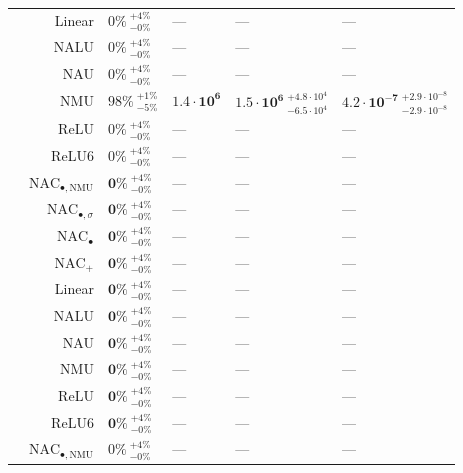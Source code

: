 \begin{longtable}{crllll}
\nopagebreak
 & Linear & $0\% {~}^{+4\%}_{-0\%}$ & --- & --- & ---\\

\nopagebreak
 & NALU & $0\% {~}^{+4\%}_{-0\%}$ & --- & --- & ---\\

\nopagebreak
 & NAU & $0\% {~}^{+4\%}_{-0\%}$ & --- & --- & ---\\

\nopagebreak
 & NMU & $98\% {~}^{+1\%}_{-5\%}$ & $\mathbf{1.4 \cdot 10^{6}}$ & $\mathbf{1.5 \cdot 10^{6}} {~}^{+4.8 \cdot 10^{4}}_{-6.5 \cdot 10^{4}}$ & $\mathbf{4.2 \cdot 10^{-7}} {~}^{+2.9 \cdot 10^{-8}}_{-2.9 \cdot 10^{-8}}$\\

\nopagebreak
 & ReLU & $0\% {~}^{+4\%}_{-0\%}$ & --- & --- & ---\\

\nopagebreak
\multirow{-10}{*}{\centering\arraybackslash $\bm{\times}$} & ReLU6 & $0\% {~}^{+4\%}_{-0\%}$ & --- & --- & ---\\
\cmidrule{1-6}
 & $\mathrm{NAC}_{\bullet,\mathrm{NMU}}$ & $\mathbf{0\%} {~}^{+4\%}_{-0\%}$ & --- & --- & ---\\

\nopagebreak
 & $\mathrm{NAC}_{\bullet,\sigma}$ & $\mathbf{0\%} {~}^{+4\%}_{-0\%}$ & --- & --- & ---\\

\nopagebreak
 & $\mathrm{NAC}_{\bullet}$ & $\mathbf{0\%} {~}^{+4\%}_{-0\%}$ & --- & --- & ---\\

\nopagebreak
 & $\mathrm{NAC}_{+}$ & $\mathbf{0\%} {~}^{+4\%}_{-0\%}$ & --- & --- & ---\\

\nopagebreak
 & Linear & $\mathbf{0\%} {~}^{+4\%}_{-0\%}$ & --- & --- & ---\\

\nopagebreak
 & NALU & $\mathbf{0\%} {~}^{+4\%}_{-0\%}$ & --- & --- & ---\\

\nopagebreak
 & NAU & $\mathbf{0\%} {~}^{+4\%}_{-0\%}$ & --- & --- & ---\\

\nopagebreak
 & NMU & $\mathbf{0\%} {~}^{+4\%}_{-0\%}$ & --- & --- & ---\\

\nopagebreak
 & ReLU & $\mathbf{0\%} {~}^{+4\%}_{-0\%}$ & --- & --- & ---\\

\nopagebreak
\multirow{-10}{*}{\centering\arraybackslash $\bm{\mathbin{/}}$} & ReLU6 & $\mathbf{0\%} {~}^{+4\%}_{-0\%}$ & --- & --- & ---\\
\cmidrule{1-6}
 & $\mathrm{NAC}_{\bullet,\mathrm{NMU}}$ & $0\% {~}^{+4\%}_{-0\%}$ & --- & --- & ---\\


\end{longtable}
